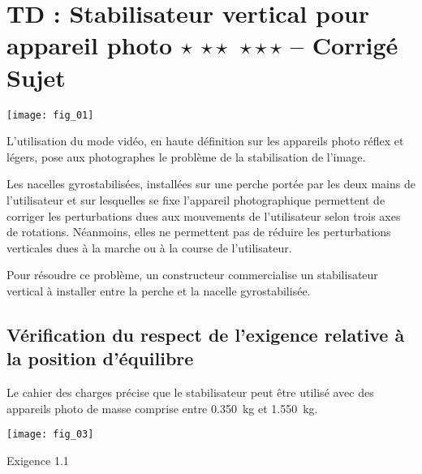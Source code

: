 \chapter*{TD  :
Stabilisateur vertical pour appareil photo \ifnormal $\star$ \else \fi \ifdifficile $\star\star$ \else \fi \iftdifficile $\star\star\star$ \else \fi
 -- \ifprof Corrigé \else Sujet \fi}

\iflivret {} \else
\ifprof  {} \else \fi
\fi

\setcounter{question}{0}

\begin{marginfigure}
\texttt{[image: fig\_01]}
\end{marginfigure}

\ifprof
\else
L’utilisation du mode vidéo, en haute définition sur les appareils photo réflex et légers, pose aux photographes le problème de la stabilisation de l’image. 
 
Les nacelles gyrostabilisées, installées sur une perche portée par les
 deux mains de l’utilisateur et sur lesquelles se fixe l’appareil photographique permettent de corriger les perturbations dues aux mouvements de l’utilisateur selon trois axes de rotations. Néanmoins, elles ne permettent pas de réduire les perturbations verticales dues à la marche ou à la course de l’utilisateur.

Pour résoudre ce problème, un constructeur commercialise un stabilisateur vertical à installer entre la perche et la nacelle gyrostabilisée.

\fi

\section*{Vérification du respect de l'exigence relative à la position d'équilibre }


\ifprof
\else
Le cahier des charges précise que le stabilisateur peut être utilisé avec des appareils photo de masse comprise entre \SI{0,350}{kg} et \SI{1,550}{kg}.
\begin{marginfigure}
\centering
\texttt{[image: fig\_03]}
\caption{Exigence 1.1}
\end{marginfigure}
\fi

